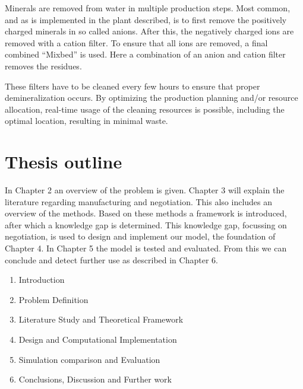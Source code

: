 Minerals are removed from water in multiple production steps. Most common, and as is implemented in the plant described, is to first remove the positively charged minerals in so called anions. After this, the negatively charged ions are removed with a cation filter. To ensure that all ions are removed, a final combined ``Mixbed'' is used. Here a combination of an anion and cation filter removes the residues.

These filters have to be cleaned every few hours to ensure that proper demineralization occurs. By optimizing the production planning and/or resource allocation, real-time usage of the cleaning resources is possible, including the optimal location, resulting in minimal waste.

\section{Thesis outline}
In Chapter 2 an overview of the problem is given. Chapter 3 will explain the literature regarding manufacturing and negotiation. This also includes an overview of the methods. Based on these methods a framework is introduced, after which a knowledge gap is determined. This knowledge gap, focussing on negotiation, is used to design and implement our model, the foundation of Chapter 4. In Chapter 5 the model is tested and evaluated. From this we can conclude and detect further use as described in Chapter 6.
\begin{enumerate}
	
	\item
	Introduction 
	\item
	Problem Definition 
	\item
	Literature Study and Theoretical Framework
	\item
	Design and Computational Implementation
	\item
	Simulation comparison and Evaluation
	\item
	Conclusions, Discussion and Further work
\end{enumerate}


